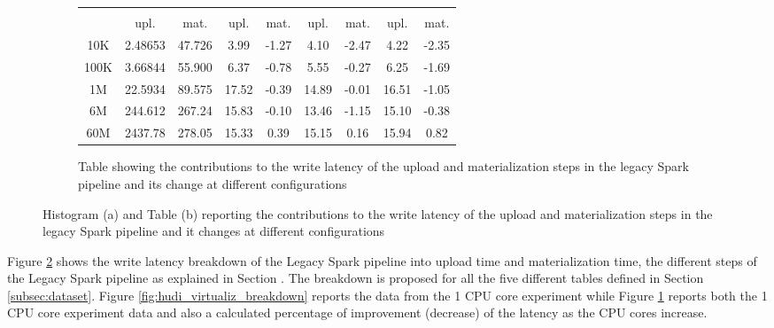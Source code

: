 \begin{figure}
    \begin{subfigure}[b]{\textwidth}
        \begin{tabular}{c c c c c c c c c} 
            \toprule
             &  &  &  & \\
            & upl. & mat. & upl. & mat. & upl. & mat. & upl. & mat.\\
            \midrule
            10K &  2.48653 & 47.726 & 3.99 & -1.27 & 4.10 & -2.47 & 4.22 & -2.35\\
            100K & 3.66844 & 55.900 & 6.37 & -0.78 & 5.55 & -0.27 & 6.25 & -1.69\\
            1M   & 22.5934 & 89.575 & 17.52 & -0.39 & 14.89 & -0.01 & 16.51 & -1.05\\
            6M   & 244.612 & 267.24 & 15.83 & -0.10 & 13.46 & -1.15 & 15.10 & -0.38\\
            60M &  2437.78 & 278.05 & 15.33 & 0.39 & 15.15 & 0.16 & 15.94 & 0.82\\
            \bottomrule
        \end{tabular}
        \caption{Table showing the contributions to the write latency of the upload and materialization steps in the legacy Spark pipeline and its change at different  configurations}
        \label{tbl:hudi_virtualiz_breakdown_cpu_perc}
    \end{subfigure}
    \caption{Histogram (a) and Table (b) reporting the contributions to the write latency of the upload and materialization steps in the legacy Spark pipeline and it changes at different  configurations}
    \label{fig_tbl:hudi_virtualiz_breakdown}
\end{figure}

Figure \ref{fig_tbl:hudi_virtualiz_breakdown} shows the write latency breakdown of the Legacy Spark pipeline into upload time and materialization time, the different steps of the Legacy Spark pipeline as explained in Section . The breakdown is proposed for all the five different tables defined in Section \ref{subsec:dataset}. Figure \ref{fig:hudi_virtualiz_breakdown} reports the data from the 1 \gls{CPU} core experiment while Figure \ref{tbl:hudi_virtualiz_breakdown_cpu_perc} reports both the 1 \gls{CPU} core experiment data and also a calculated percentage of improvement (decrease) of the latency as the \gls{CPU} cores increase.


